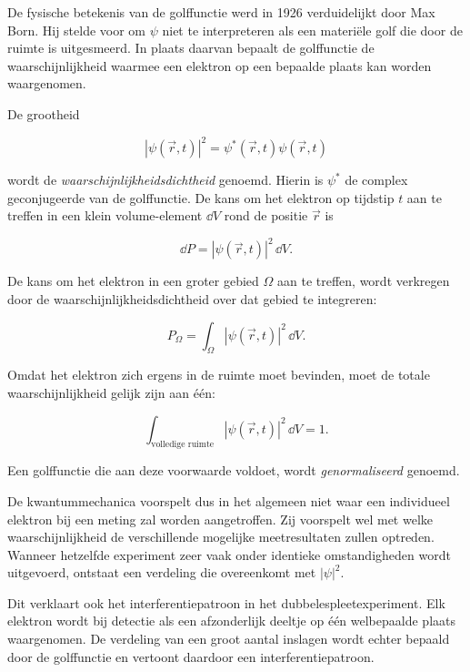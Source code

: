 De fysische betekenis van de golffunctie werd in 1926 verduidelijkt door Max Born. Hij stelde voor om $\psi$ niet te interpreteren als een materiële golf die door de ruimte is uitgesmeerd. In plaats daarvan bepaalt de golffunctie de waarschijnlijkheid waarmee een elektron op een bepaalde plaats kan worden waargenomen.

De grootheid

\begin{equation}
|\psi(\vec{r},t)|^2
=
\psi^*(\vec{r},t)\psi(\vec{r},t)
\end{equation}

wordt de \emph{waarschijnlijkheidsdichtheid} genoemd. Hierin is $\psi^*$ de complex geconjugeerde van de golffunctie. De kans om het elektron op tijdstip $t$ aan te treffen in een klein volume-element $\dd V$ rond de positie $\vec{r}$ is

\begin{equation}
\boxed{
\dd P
=
|\psi(\vec{r},t)|^2\,\dd V.
}
\end{equation}

De kans om het elektron in een groter gebied $\Omega$ aan te treffen, wordt verkregen door de waarschijnlijkheidsdichtheid over dat gebied te integreren:

\begin{equation}
P_{\Omega}
=
\int_{\Omega}
|\psi(\vec{r},t)|^2\,\dd V.
\end{equation}

Omdat het elektron zich ergens in de ruimte moet bevinden, moet de totale waarschijnlijkheid gelijk zijn aan één:

\begin{equation}
\int_{\text{volledige ruimte}}
|\psi(\vec{r},t)|^2\,\dd V
=
1.
\end{equation}

Een golffunctie die aan deze voorwaarde voldoet, wordt \emph{genormaliseerd} genoemd.

De kwantummechanica voorspelt dus in het algemeen niet waar een individueel elektron bij een meting zal worden aangetroffen. Zij voorspelt wel met welke waarschijnlijkheid de verschillende mogelijke meetresultaten zullen optreden. Wanneer hetzelfde experiment zeer vaak onder identieke omstandigheden wordt uitgevoerd, ontstaat een verdeling die overeenkomt met $|\psi|^2$.

Dit verklaart ook het interferentiepatroon in het dubbelespleetexperiment. Elk elektron wordt bij detectie als een afzonderlijk deeltje op één welbepaalde plaats waargenomen. De verdeling van een groot aantal inslagen wordt echter bepaald door de golffunctie en vertoont daardoor een interferentiepatroon.

